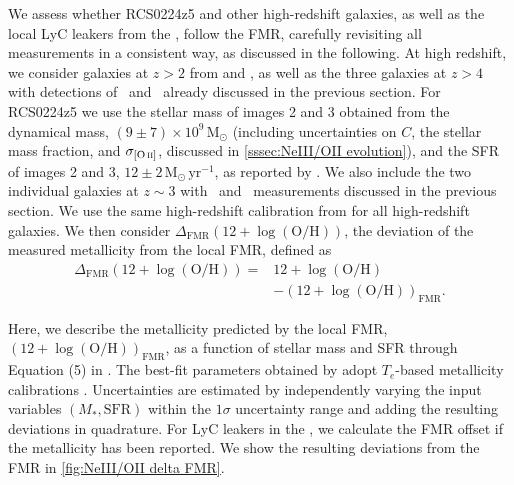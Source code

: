 We assess whether RCS0224z5 and other high-redshift galaxies, as well as the local LyC leakers from the \Isample, follow the FMR, carefully revisiting all measurements in a consistent way, as discussed in the following. At high redshift, we consider galaxies at $z > 2$ from \citet{2021ApJ...914...19S} and \citet{2014A&A...563A..58T}, as well as the three galaxies at $z > 4$ with detections of \NeIII\ and \OII\ already discussed in the previous section. For RCS0224z5 we use the stellar mass of images 2 and 3 obtained from the dynamical mass, $(9 \pm 7) \times 10^{9} \, \mathrm{M}_\odot$ (including uncertainties on $C$, the stellar mass fraction, and $\sigma_\OII$, discussed in \cref{sssec:NeIII/OII evolution}), and the SFR of images 2 and 3, $12 \pm 2 \, \mathrm{M_\odot \, yr^{-1}}$, as reported by \citet{2007MNRAS.376..479S}. We also include the two individual galaxies at $z \sim 3$ with \NeIII\ and \OII\ measurements discussed in the previous section. We use the same high-redshift calibration from \citet{2018ApJ...859..175B} for all high-redshift galaxies. We then consider $\Delta_\text{FMR} ( 12 + \log ( \text{O/H} ))$, the deviation of the measured metallicity from the local FMR, defined as
\begin{align*}
    \Delta_\text{FMR} \left( 12 + \log \left ( \text{O/H} \right) \right) = & 12 + \log \left ( \text{O/H} \right)
    \\
    & - \left( 12 + \log \left ( \text{O/H} \right) \right)_\text{FMR}.
\end{align*}

\noindent Here, we describe the metallicity predicted by the local FMR, $( 12 + \log ( \text{O/H} ))_\text{FMR}$, as a function of stellar mass and SFR through Equation (5) in \citet{2020MNRAS.491..944C}. The best-fit parameters obtained by \citeauthor{2020MNRAS.491..944C} adopt $T_e$-based metallicity calibrations \citep[as][, but based on the full SDSS dataset]{2018ApJ...859..175B}. Uncertainties are estimated by independently varying the input variables $(M_*, \text{SFR})$ within the $1 \sigma$ uncertainty range and adding the resulting deviations in quadrature. For LyC leakers in the \Isample, we calculate the FMR offset if the metallicity has been reported. We show the resulting deviations from the FMR in \cref{fig:NeIII/OII delta FMR}.

